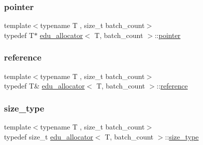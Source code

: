 \mbox{\label{classedu__allocator_a9dc4e322674eb71d33056e8ab3c69e8f}} 
\subsubsection{\texorpdfstring{pointer}{pointer}}
{\footnotesize\ttfamily template$<$typename T , size\+\_\+t batch\+\_\+count$>$ \\
typedef T$\ast$ \hyperlink{classedu__allocator}{edu\+\_\+allocator}$<$ T, batch\+\_\+count $>$\+::\hyperlink{classedu__allocator_a9dc4e322674eb71d33056e8ab3c69e8f}{pointer}}

\mbox{\label{classedu__allocator_a9bf7a7dfc44606f5fc1862518bc55a8d}} 
\subsubsection{\texorpdfstring{reference}{reference}}
{\footnotesize\ttfamily template$<$typename T , size\+\_\+t batch\+\_\+count$>$ \\
typedef T\& \hyperlink{classedu__allocator}{edu\+\_\+allocator}$<$ T, batch\+\_\+count $>$\+::\hyperlink{classedu__allocator_a9bf7a7dfc44606f5fc1862518bc55a8d}{reference}}

\mbox{\label{classedu__allocator_a0f1fd4593fe3a8dcaf9381821f88a8e4}} 
\subsubsection{\texorpdfstring{size\+\_\+type}{size\_type}}
{\footnotesize\ttfamily template$<$typename T , size\+\_\+t batch\+\_\+count$>$ \\
typedef size\+\_\+t \hyperlink{classedu__allocator}{edu\+\_\+allocator}$<$ T, batch\+\_\+count $>$\+::\hyperlink{classedu__allocator_a0f1fd4593fe3a8dcaf9381821f88a8e4}{size\+\_\+type}}

\mbox{\label{classedu__allocator_aa6e217af32ed52f939e61187da75f6f4}} 
